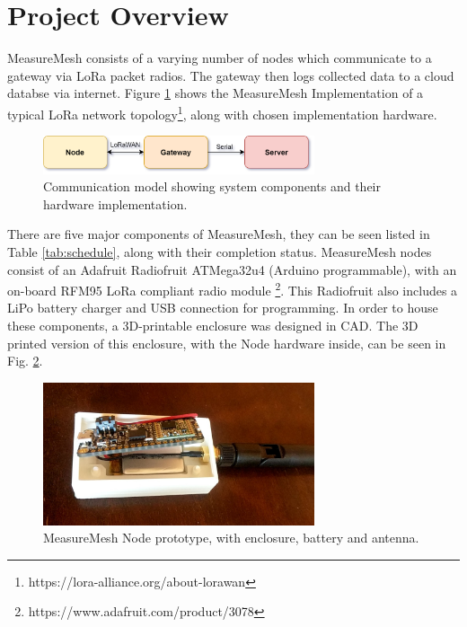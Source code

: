 \documentclass{IEEEtran}
\begin{document}
\section{Project Overview} 

MeasureMesh consists of a varying number of nodes which communicate to a gateway via LoRa packet radios. The gateway then logs collected data to a cloud databse via internet. Figure \ref{fig:mmoverview} shows the MeasureMesh Implementation of a typical LoRa network topology\footnote{https://lora-alliance.org/about-lorawan}, along with chosen implementation hardware.



\begin{figure}[h!]
    \centering
    \includegraphics[width=8cm]{images/ComonentOverview.png}
    \caption{Communication model showing system components and their hardware implementation.}
    \label{fig:mmoverview}
\end{figure}


There are five major components of MeasureMesh, they can be seen listed in Table \ref{tab:schedule}, along with their completion status. MeasureMesh nodes consist of an Adafruit Radiofruit ATMega32u4 (Arduino programmable), with an on-board RFM95 LoRa compliant radio module \footnote{https://www.adafruit.com/product/3078}. This Radiofruit also includes a LiPo battery charger and USB connection for programming. In order to house these components, a 3D-printable enclosure was designed in CAD. The 3D printed version of this enclosure, with the Node hardware inside, can be seen in Fig. \ref{fig:nodeproto}. 


\begin{figure}
    \centering
    \includegraphics[width=8cm]{images/nodePrototype}
    \caption{MeasureMesh Node prototype, with enclosure, battery and antenna.}
    \label{fig:nodeproto}
\end{figure}
\end{document}
